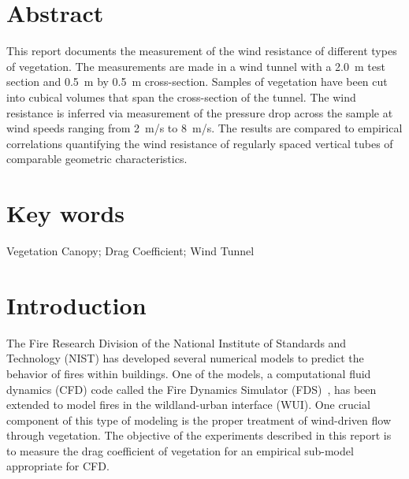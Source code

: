 \documentclass[12pt]{article}
\begin{document}
\pagestyle{plain}

\section*{Abstract}

This report documents the measurement of the wind resistance of different types of vegetation. The measurements are made in a wind tunnel with a 2.0~\si{m} test section and 0.5~\si{m} by 0.5~\si{m} cross-section. Samples of vegetation have been cut into cubical volumes that span the cross-section of the tunnel. The wind resistance is inferred via measurement of the pressure drop across the sample at wind speeds ranging from 2~\si{m/s} to 8~\si{m/s}. The results are compared to empirical correlations quantifying the wind resistance of regularly spaced vertical tubes of comparable geometric characteristics.

\section*{Key words}

Vegetation Canopy; Drag Coefficient; Wind Tunnel

\cleardoublepage

\begin{center}
	\tableofcontents
	\listoftables
	\listoffigures
\end{center}

\cleardoublepage

\pagestyle{plain}


\section{Introduction}
\label{sec:intro}

The Fire Research Division of the National Institute of Standards and Technology (NIST) has developed several numerical models to predict the behavior of fires within buildings. One of the models, a computational fluid dynamics (CFD) code called the Fire Dynamics Simulator (FDS)~\cite{FDS_Tech_Guide}, has been extended to model fires in the wildland-urban interface (WUI). One crucial component of this type of modeling is the proper treatment of wind-driven flow through vegetation. The objective of the experiments described in this report is to measure the drag coefficient of vegetation for an empirical sub-model appropriate for CFD.
\end{document}
